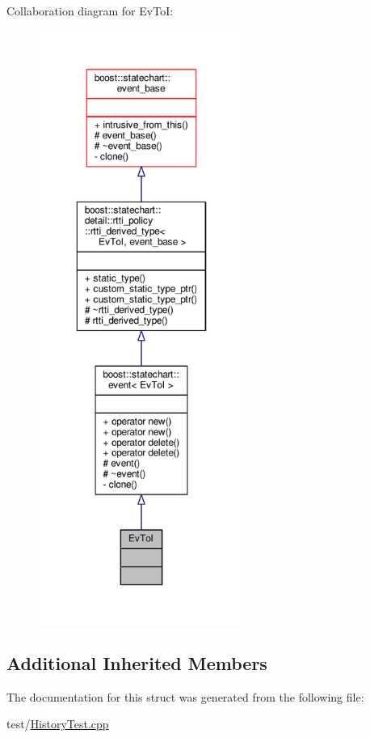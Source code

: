 Collaboration diagram for Ev\+ToI\+:
\nopagebreak
\begin{figure}[H]
\begin{center}
\leavevmode
\includegraphics[height=550pt]{struct_ev_to_i__coll__graph}
\end{center}
\end{figure}
\subsection*{Additional Inherited Members}


The documentation for this struct was generated from the following file\+:\begin{DoxyCompactItemize}
\item 
test/\mbox{\hyperlink{_history_test_8cpp}{History\+Test.\+cpp}}\end{DoxyCompactItemize}
